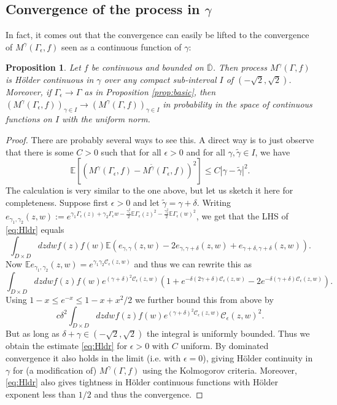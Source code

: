 \documentclass[11pt]{amsart}
\newtheorem{prop}[thm]{Proposition}
\newcommand{\C}{\mathcal C}
\newcommand{\D}{\mathbb D}
\newcommand{\E}{\mathbb E}
\renewcommand{\1}{\mathbf 1}
\newcommand{\eps}{\epsilon}
\begin{document}
\subsection*{Convergence of the process in $\gamma$}

In fact, it comes out that the convergence can easily be lifted to the convergence of $M^\gamma(\Gamma_\eps,f)$ seen as a continuous function of $\gamma$:

\begin{prop}
Let $f$ be continuous and bounded on $\overline{\D}$. Then process $M^\gamma(\Gamma,f)$ is H\"older continuous in $\gamma$ over any compact sub-interval $I$ of $(-\sqrt{2},\sqrt{2})$. Moreover, if $\Gamma_\eps \to \Gamma$ as in Proposition \ref{prop:basic}, then $(M^\gamma(\Gamma_\eps, f))_{\gamma \in I} \to (M^\gamma(\Gamma,f))_{\gamma \in I}$ in probability in the space of continuous functions on $I$ with the uniform norm.
\end{prop}

\begin{proof}
There are probably several ways to see this. A direct way is to just observe that there is some $C >0$ such that for all $\eps > 0$ and for all $\gamma, \tilde \gamma \in I$, we have
\begin{equation}\label{eq:Hldr}
\E \left[(M^\gamma(\Gamma_\eps, f) - M^{\tilde \gamma}(\Gamma_\eps, f))^2\right] \leq C|\gamma -\tilde \gamma|^2.
\end{equation}
The calculation is very similar to the one above, but let us sketch it here for completeness. Suppose first $\eps >0$ and let $\tilde \gamma = \gamma + \delta$. Writing $e_{\gamma_1, \gamma_2}(z,w) := e^{\gamma_1 \Gamma_\eps(z) + \gamma_2 \Gamma_\eps{w} - \frac{\gamma_1^2}{2}\E \Gamma_\eps(z)^2 - \frac{\gamma_2^2}{2}\E \Gamma_\eps(w)^2}$, we get that the LHS of \eqref{eq:Hldr} equals
$$\int_{D \times D} dzdwf(z)f(w)\E\left( e_{\gamma, \gamma}(z,w) - 2e_{\gamma, \gamma + \delta}(z,w) + e_{\gamma + \delta, \gamma + \delta}(z,w)\right).$$
Now $\E e_{\gamma_1, \gamma_2}(z,w) = e^{\gamma_1 \gamma_2 \C_\eps(z,w)}$ and thus we can rewrite this as 
$$\int_{D \times D} dzdwf(z)f(w) e^{(\gamma+\delta)^2\C_\eps(z,w)}\left(1+e^{-\delta(2\gamma +\delta) \C_\eps(z,w)} - 2e^{-\delta(\gamma+\delta) \C_\eps(z,w)}\right).$$
Using $1- x \leq e^{-x} \leq 1 - x + x^2/2$ we further bound this from above by
$$c\delta^2 \int_{D \times D} dzdwf(z)f(w) e^{(\gamma+\delta)^2\C_\eps(z,w)}\C_\eps(z,w)^2.$$
But as long as $\delta + \gamma \in (-\sqrt{2}, \sqrt{2})$ the integral is uniformly bounded.  Thus we obtain the estimate \eqref{eq:Hldr} for $\eps >0$ with $C$ uniform. By dominated convergence it also holds in the limit (i.e. with $\eps = 0$), giving H\"older continuity in $\gamma$ for (a modification of) $M^\gamma(\Gamma,f)$ using the Kolmogorov criteria. Moreover, \eqref{eq:Hldr} also gives tightness in H\"older continuous functions with H\"older exponent less than $1/2$ and thus the convergence.
\end{proof}
 
\end{document}
